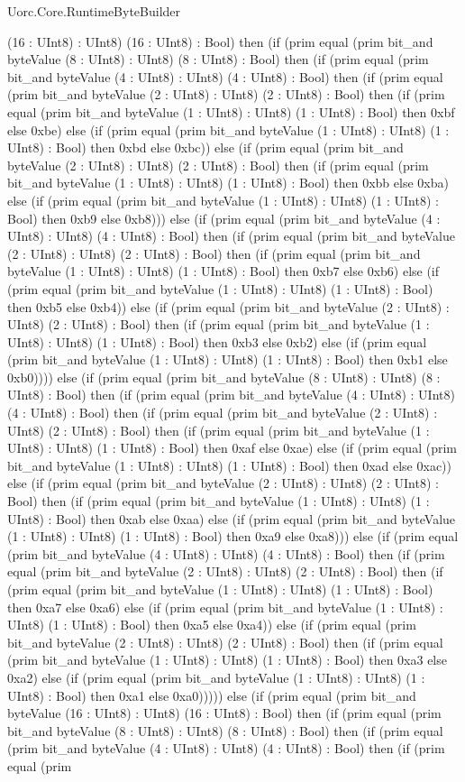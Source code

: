 \begin{lexlean}{Uorc.Core.RuntimeByteBuilder}
\begin{semanticmodule}
{(16 : UInt8) : UInt8) (16 : UInt8) : Bool) then (if (prim equal (prim bit_and byteValue (8 : UInt8) : UInt8) (8 : UInt8) : Bool) then (if (prim equal (prim bit_and byteValue (4 : UInt8) : UInt8) (4 : UInt8) : Bool) then (if (prim equal (prim bit_and byteValue (2 : UInt8) : UInt8) (2 : UInt8) : Bool) then (if (prim equal (prim bit_and byteValue (1 : UInt8) : UInt8) (1 : UInt8) : Bool) then 0xbf else 0xbe) else (if (prim equal (prim bit_and byteValue (1 : UInt8) : UInt8) (1 : UInt8) : Bool) then 0xbd else 0xbc)) else (if (prim equal (prim bit_and byteValue (2 : UInt8) : UInt8) (2 : UInt8) : Bool) then (if (prim equal (prim bit_and byteValue (1 : UInt8) : UInt8) (1 : UInt8) : Bool) then 0xbb else 0xba) else (if (prim equal (prim bit_and byteValue (1 : UInt8) : UInt8) (1 : UInt8) : Bool) then 0xb9 else 0xb8))) else (if (prim equal (prim bit_and byteValue (4 : UInt8) : UInt8) (4 : UInt8) : Bool) then (if (prim equal (prim bit_and byteValue (2 : UInt8) : UInt8) (2 : UInt8) : Bool) then (if (prim equal (prim bit_and byteValue (1 : UInt8) : UInt8) (1 : UInt8) : Bool) then 0xb7 else 0xb6) else (if (prim equal (prim bit_and byteValue (1 : UInt8) : UInt8) (1 : UInt8) : Bool) then 0xb5 else 0xb4)) else (if (prim equal (prim bit_and byteValue (2 : UInt8) : UInt8) (2 : UInt8) : Bool) then (if (prim equal (prim bit_and byteValue (1 : UInt8) : UInt8) (1 : UInt8) : Bool) then 0xb3 else 0xb2) else (if (prim equal (prim bit_and byteValue (1 : UInt8) : UInt8) (1 : UInt8) : Bool) then 0xb1 else 0xb0)))) else (if (prim equal (prim bit_and byteValue (8 : UInt8) : UInt8) (8 : UInt8) : Bool) then (if (prim equal (prim bit_and byteValue (4 : UInt8) : UInt8) (4 : UInt8) : Bool) then (if (prim equal (prim bit_and byteValue (2 : UInt8) : UInt8) (2 : UInt8) : Bool) then (if (prim equal (prim bit_and byteValue (1 : UInt8) : UInt8) (1 : UInt8) : Bool) then 0xaf else 0xae) else (if (prim equal (prim bit_and byteValue (1 : UInt8) : UInt8) (1 : UInt8) : Bool) then 0xad else 0xac)) else (if (prim equal (prim bit_and byteValue (2 : UInt8) : UInt8) (2 : UInt8) : Bool) then (if (prim equal (prim bit_and byteValue (1 : UInt8) : UInt8) (1 : UInt8) : Bool) then 0xab else 0xaa) else (if (prim equal (prim bit_and byteValue (1 : UInt8) : UInt8) (1 : UInt8) : Bool) then 0xa9 else 0xa8))) else (if (prim equal (prim bit_and byteValue (4 : UInt8) : UInt8) (4 : UInt8) : Bool) then (if (prim equal (prim bit_and byteValue (2 : UInt8) : UInt8) (2 : UInt8) : Bool) then (if (prim equal (prim bit_and byteValue (1 : UInt8) : UInt8) (1 : UInt8) : Bool) then 0xa7 else 0xa6) else (if (prim equal (prim bit_and byteValue (1 : UInt8) : UInt8) (1 : UInt8) : Bool) then 0xa5 else 0xa4)) else (if (prim equal (prim bit_and byteValue (2 : UInt8) : UInt8) (2 : UInt8) : Bool) then (if (prim equal (prim bit_and byteValue (1 : UInt8) : UInt8) (1 : UInt8) : Bool) then 0xa3 else 0xa2) else (if (prim equal (prim bit_and byteValue (1 : UInt8) : UInt8) (1 : UInt8) : Bool) then 0xa1 else 0xa0))))) else (if (prim equal (prim bit_and byteValue (16 : UInt8) : UInt8) (16 : UInt8) : Bool) then (if (prim equal (prim bit_and byteValue (8 : UInt8) : UInt8) (8 : UInt8) : Bool) then (if (prim equal (prim bit_and byteValue (4 : UInt8) : UInt8) (4 : UInt8) : Bool) then (if (prim equal (prim }
\end{semanticmodule}
\end{lexlean}
